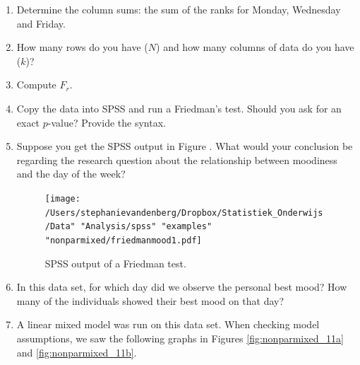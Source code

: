 \documentclass[]{book}\usepackage[]{graphicx}\usepackage[]{color}
\newenvironment{knitrout}{}{} %
\begin{document}
\begin{enumerate}
\begin{tabular}{llrrrr}
  & \dots & \dots  & \dots & \dots  & \dots  \\
  & \dots & \dots  & \dots & \dots  & \dots  \\
  & \dots & \dots  & \dots & \dots  & \dots  \\
  & \dots & \dots  & \dots & \dots  & \dots  \\
  & \dots & \dots  & \dots & \dots  & \dots  \\
  & \dots & \dots  & \dots & \dots  & \dots  \\
 \end{tabular}
\\
\\
\item Determine the column sums: the sum of the ranks for Monday, Wednesday and Friday.
\item How many rows do you have ($N$) and how many columns of data do you have ($k$)?
\item Compute $F_r$.
\item Copy the data into SPSS and run a Friedman's test. Should you ask for an exact $p$-value? Provide the syntax.
\item Suppose you get the SPSS output in Figure \label{ref:friedmanmood1}. What would your conclusion be regarding the research question about the relationship between moodiness and the day of the week?

\begin{figure}[h]
    \begin{center}
       \texttt{[image: /Users/stephanievandenberg/Dropbox/Statistiek\_Onderwijs/Data" "Analysis/spss" "examples" "nonparmixed/friedmanmood1.pdf]}
    \end{center}
    \caption{SPSS output of a Friedman test.}
    \label{fig:friedmanmood1}
\end{figure}

\item
In this data set, for which day did we observe the personal best mood? How many of the individuals showed their best mood on that day?


\item
A linear mixed model was run on this data set. When checking model assumptions, we saw the following graphs in Figures \ref{fig:nonparmixed_11a} and \ref{fig:nonparmixed_11b}.

\begin{knitrout}
\color{fgcolor}\begin{figure}


\end{figure}
\end{knitrout}
\end{enumerate}
\end{document}
